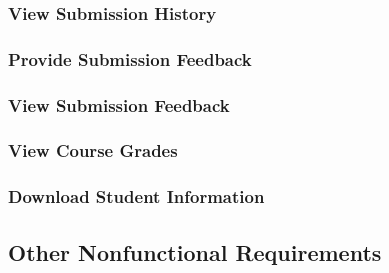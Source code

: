 \documentclass{article}
\begin{document}
\subsubsection{View Submission History}

\subsubsection{Provide Submission Feedback}

\subsubsection{View Submission Feedback}

\subsubsection{View Course Grades}



\subsubsection{Download Student Information}

\newpage
\subsection{Other Nonfunctional Requirements}





\end{document}
